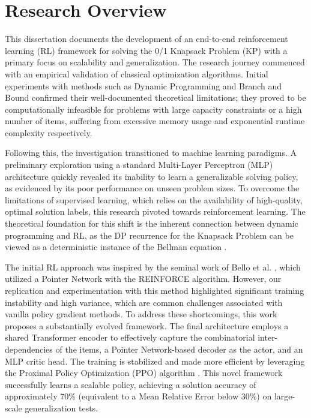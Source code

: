 \section{Research Overview}

This dissertation documents the development of an end-to-end reinforcement learning (RL) framework for solving the 0/1 Knapsack Problem (KP) with a primary focus on scalability and generalization. The research journey commenced with an empirical validation of classical optimization algorithms. Initial experiments with methods such as Dynamic Programming and Branch and Bound confirmed their well-documented theoretical limitations; they proved to be computationally infeasible for problems with large capacity constraints or a high number of items, suffering from excessive memory usage and exponential runtime complexity respectively.

Following this, the investigation transitioned to machine learning paradigms. A preliminary exploration using a standard Multi-Layer Perceptron (MLP) architecture quickly revealed its inability to learn a generalizable solving policy, as evidenced by its poor performance on unseen problem sizes. To overcome the limitations of supervised learning, which relies on the availability of high-quality, optimal solution labels, this research pivoted towards reinforcement learning. The theoretical foundation for this shift is the inherent connection between dynamic programming and RL, as the DP recurrence for the Knapsack Problem can be viewed as a deterministic instance of the Bellman equation \cite{tamarValueIterationNetworks2017}.

The initial RL approach was inspired by the seminal work of Bello et al. \cite{belloNeuralCombinatorialOptimization2017}, which utilized a Pointer Network with the REINFORCE algorithm. However, our replication and experimentation with this method highlighted significant training instability and high variance, which are common challenges associated with vanilla policy gradient methods. To address these shortcomings, this work proposes a substantially evolved framework. The final architecture employs a shared Transformer encoder to effectively capture the combinatorial inter-dependencies of the items, a Pointer Network-based decoder as the actor, and an MLP critic head. The training is stabilized and made more efficient by leveraging the Proximal Policy Optimization (PPO) algorithm \cite{schulmanProximalPolicyOptimization2017}. This novel framework successfully learns a scalable policy, achieving a solution accuracy of approximately 70\% (equivalent to a Mean Relative Error below 30\%) on large-scale generalization tests.